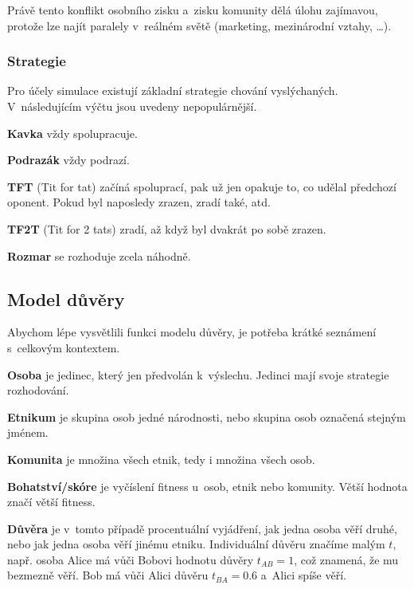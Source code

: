 \documentclass[pdftex,a4paper,12pt]{extarticle}
\begin{document}
Právě tento konflikt osobního zisku a~zisku komunity dělá úlohu zajímavou, protože lze najít paralely v~reálném světě (marketing, mezinárodní vztahy, \dots).

\subsubsection{Strategie}
\label{Strategie}
Pro účely simulace existují základní strategie chování vyslýchaných. V~následujícím výčtu jsou uvedeny nepopulárnější.

\begin{description}
\item \textbf{Kavka} vždy spolupracuje.
\item \textbf{Podrazák} vždy podrazí.
\item \textbf{TFT} (Tit for tat) začíná spoluprací, pak už jen opakuje to, co udělal předchozí oponent. Pokud byl naposledy zrazen, zradí také, atd.
\item \textbf{TF2T} (Tit for 2 tats) zradí, až když byl dvakrát po sobě zrazen.
\item \textbf{Rozmar} se rozhoduje zcela náhodně.
\end{description}


\subsection{Model důvěry}
\label{Model důvěry}
Abychom lépe vysvětlili funkci modelu důvěry, je potřeba krátké seznámení s~celkovým kontextem. 

\begin{description}
\item \textbf{Osoba} je jedinec, který jen předvolán k~výslechu. Jedinci mají svoje strategie rozhodování.
\item \textbf{Etnikum} je skupina osob jedné národnosti, nebo skupina osob označená stejným jménem.
\item \textbf{Komunita} je množina všech etnik, tedy i množina všech osob.
\item \textbf{Bohatství/skóre} je vyčíslení fitness u~osob, etnik nebo komunity. Větší hodnota značí větší fitness. 
\end{description}

\textbf{Důvěra} je v~tomto případě procentuální vyjádření, jak jedna osoba věří druhé, nebo jak jedna osoba věří jinému etniku. Individuální důvěru značíme malým $t$, např. osoba Alice má vůči Bobovi hodnotu důvěry $t_{AB} = 1$, což znamená, že mu bezmezně věří. Bob má vůči Alici důvěru $t_{BA} = 0.6$ a~Alici spíše věří.
\end{document}
